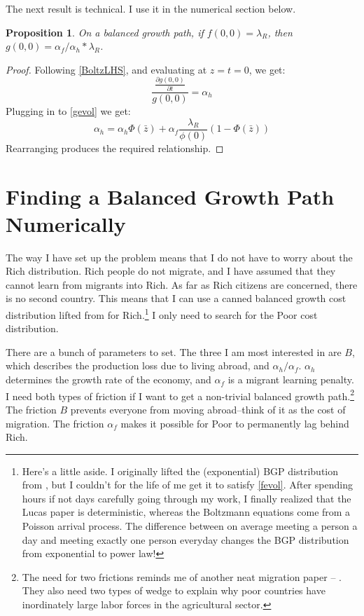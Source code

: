 \documentclass[12pt]{article}
\newtheorem{proposition}[theorem]{Proposition}
\begin{document}
    The next result is technical.  I use it in the numerical section below.
\begin{proposition}
  On a balanced growth path, if $f(0,0) = \lambda_R$, then $g(0,0) = \alpha_f/\alpha_h * \lambda_R$.
\end{proposition}
\begin{proof}
    Following \eqref{BoltzLHS}, and evaluating at $z=t=0$, we get:
    \[
        \frac{\frac{\partial g(0,0)}{\partial {t}}}{g(0,0)}  = \alpha_h
    \]
    Plugging in to \eqref{gevol} we get:
    \[
        \alpha_h = \alpha_h \Phi(\bar{z}) + \alpha_f \frac{\lambda_R}{\phi(0)}(1-\Phi(\bar{z}))
    \]
    Rearranging produces the required relationship.
\end{proof}

\section{Finding a Balanced Growth Path Numerically}

The way I have set up the problem means that I do not have to worry about the Rich distribution.  Rich people do not migrate, and I have assumed that they cannot learn from migrants into Rich.  As far as Rich citizens are concerned, there is no second country.  This means that I can use a canned balanced growth cost distribution lifted from \citet{Alvarezetal2007} for Rich.\footnote{Here's a little aside.  I originally lifted the (exponential) BGP distribution from \citet{Lucas2009}, but I couldn't for the life of me get it to satisfy \eqref{fevol}.  After spending hours if not days carefully going through my work, I finally realized that the Lucas paper is deterministic, whereas the Boltzmann equations come from a Poisson arrival process.  The difference between on average meeting a person a day and meeting exactly one person everyday changes the BGP distribution from exponential to power law!} I only need to search for the Poor cost distribution.

There are a bunch of parameters to set.  The three I am most interested in are $B$, which describes the production loss due to living abroad, and $\alpha_h/\alpha_f$.  $\alpha_h$ determines the growth rate of the economy, and $\alpha_f$ is a migrant learning penalty.  I need both types of friction if I want to get a non-trivial balanced growth path.\footnote{The need for two frictions reminds me of another neat migration paper -- \citet{Restucciaetal2008}.  They also need two types of wedge to explain why poor countries have inordinately large labor forces in the agricultural sector.}  The friction $B$ prevents everyone from moving abroad--think of it as the cost of migration.  The friction $\alpha_f$ makes it possible for Poor to permanently lag behind Rich.
\end{document}
